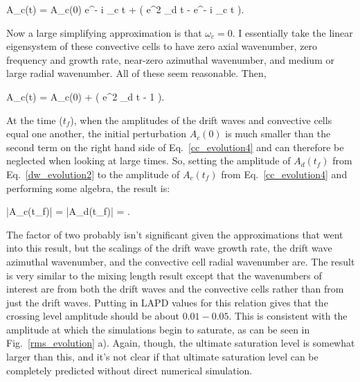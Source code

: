 \beq
\label{cc_evolution3}
A_c(t) = A_c(0) e^{- i \omega_c t} +  \left( e^{2 \gamma_d t} - e^{- i \omega_c t}  \right).
\eeq

Now a large simplifying approximation is that $\omega_c = 0$. I essentially take the linear eigensystem of these convective cells to have zero axial wavenumber, zero frequency and growth rate, 
near-zero azimuthal wavenumber, and medium or large radial wavenumber. All of these seem reasonable. Then,

\beq
\label{cc_evolution4}
A_c(t) = A_c(0) +  \left( e^{2 \gamma_d t} - 1  \right).
\eeq

At the time ($t_f$), when the amplitudes of the drift waves and convective cells equal one another, the initial perturbation $A_c(0)$ is much smaller than the second term on the right hand side
of Eq.~\ref{cc_evolution4} and can therefore be neglected when looking at large times. So, setting the amplitude of $A_d(t_f)$ from Eq.~\ref{dw_evolution2} to the amplitude of 
$A_c(t_f)$ from Eq.~\ref{cc_evolution4} and performing some algebra, the result is:

\beq
\label{dw_cc_scaling}
|A_c(t_f)| = |A_d(t_f)| = .
\eeq

The factor of two probably isn't significant given the approximations that went into this result, but the scalings of the drift wave growth rate, the drift wave azimuthal wavenumber,
and the convective cell radial wavenumber are. The result is very similar to the mixing length result except that the wavenumbers of interest are from both the drift waves and the
convective cells rather than from just the drift waves. Putting in LAPD values for this relation gives that the crossing level amplitude should be about $0.01-0.05$. This is consistent
with the amplitude at which the simulations begin to saturate, as can be seen in Fig.~\ref{rms_evolution} a). Again, though, the ultimate saturation level is somewhat larger than this,
and it's not clear if that ultimate saturation level can be completely predicted without direct numerical simulation.
